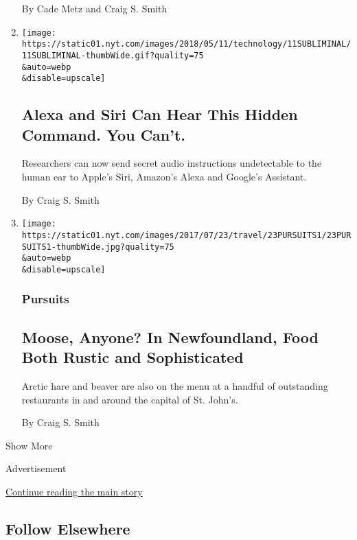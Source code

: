 \begin{enumerate}
  By Cade Metz and Craig S. Smith
\item
  \href{/2018/05/10/technology/alexa-siri-hidden-command-audio-attacks.html}{}

  \texttt{[image: https://static01.nyt.com/images/2018/05/11/technology/11SUBLIMINAL/11SUBLIMINAL-thumbWide.gif?quality=75\\\&auto=webp\\\&disable=upscale]}

  \hypertarget{alexa-and-siri-can-hear-this-hidden-command-you-cant}{%
  \subsection{Alexa and Siri Can Hear This Hidden Command. You
  Can't.}\label{alexa-and-siri-can-hear-this-hidden-command-you-cant}}

  Researchers can now send secret audio instructions undetectable to the
  human ear to Apple's Siri, Amazon's Alexa and Google's Assistant.

  By Craig S. Smith
\item
  \href{/2017/07/19/travel/food-newfoundland-restaurants-canada-st-johns.html}{}

  \texttt{[image: https://static01.nyt.com/images/2017/07/23/travel/23PURSUITS1/23PURSUITS1-thumbWide.jpg?quality=75\\\&auto=webp\\\&disable=upscale]}

  \hypertarget{pursuits}{%
  \subsubsection{Pursuits}\label{pursuits}}

  \hypertarget{moose-anyone-in-newfoundland-food-both-rustic-and-sophisticated}{%
  \subsection{Moose, Anyone? In Newfoundland, Food Both Rustic and
  Sophisticated}\label{moose-anyone-in-newfoundland-food-both-rustic-and-sophisticated}}

  Arctic hare and beaver are also on the menu at a handful of
  outstanding restaurants in and around the capital of St. John's.

  By Craig S. Smith
\end{enumerate}

Show More

Advertisement

\protect\hyperlink{after-mid2}{Continue reading the main story}

\hypertarget{follow-elsewhere}{%
\subsection{Follow Elsewhere}\label{follow-elsewhere}}

